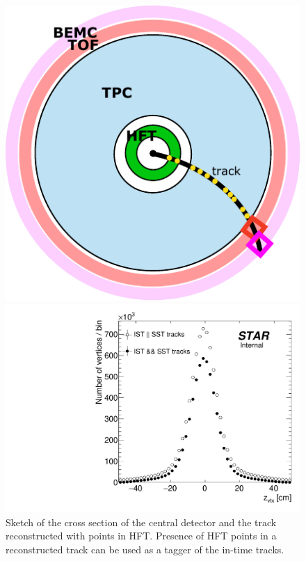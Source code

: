 \begin{figure}[b!]%
\centering%
\begin{minipage}{.4725\textwidth}%
  \centering%
  \includegraphics[width=0.965\linewidth]{graphics/systematicsEfficiency/TofSyst/effSketch.pdf}%
  \caption[Sketch of the track with points in HFT.]%
  {Sketch of the cross section of the central detector and the track reconstructed with points in HFT. Presence of HFT points in a reconstructed track can be used as a tagger of the in-time tracks.}
  \label{fig:hftEffSketch}
\end{minipage}%
\quad\quad%
\begin{minipage}{.4725\textwidth}%
  \centering%
  \includegraphics[width=\linewidth]{graphics/systematicsEfficiency/TofSyst/zVtxHFT.pdf}%

\end{minipage}
\end{figure}
